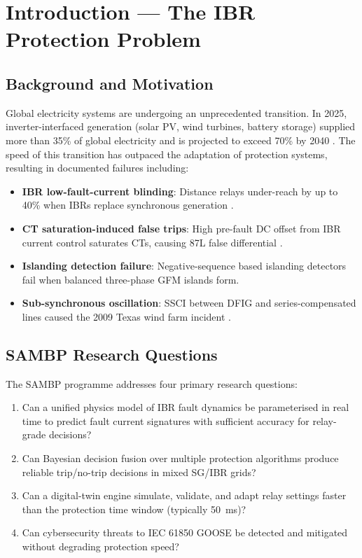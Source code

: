 \documentclass[11pt,a4paper]{report}
\newcommand{\sambp}{\textsc{SAMBP}}
\newcommand{\ibr}{\textsc{IBR}}
\begin{document}
\chapter{Introduction — The IBR Protection Problem}
\label{ch:intro}

\section{Background and Motivation}

Global electricity systems are undergoing an unprecedented transition. In 2025, inverter-interfaced generation (solar PV, wind turbines, battery storage) supplied more than 35\% of global electricity and is projected to exceed 70\% by 2040 \cite{irena2025}. The speed of this transition has outpaced the adaptation of protection systems, resulting in documented failures including:

\begin{itemize}
  \item \textbf{IBR low-fault-current blinding}: Distance relays under-reach by up to 40\% when IBRs replace synchronous generation \cite{nerc2017}.
  \item \textbf{CT saturation-induced false trips}: High pre-fault DC offset from IBR current control saturates CTs, causing 87L false differential \cite{iec87l2019}.
  \item \textbf{Islanding detection failure}: Negative-sequence based islanding detectors fail when balanced three-phase GFM islands form.
  \item \textbf{Sub-synchronous oscillation}: SSCI between DFIG and series-compensated lines caused the 2009 Texas wind farm incident \cite{ssci2010}.
\end{itemize}

\section{SAMBP Research Questions}

The \sambp{} programme addresses four primary research questions:

\begin{enumerate}
  \item[\textbf{RQ1}] Can a unified physics model of \ibr{} fault dynamics be parameterised in real time to predict fault current signatures with sufficient accuracy for relay-grade decisions?
  \item[\textbf{RQ2}] Can Bayesian decision fusion over multiple protection algorithms produce reliable trip/no-trip decisions in mixed SG/IBR grids?
  \item[\textbf{RQ3}] Can a digital-twin engine simulate, validate, and adapt relay settings faster than the protection time window (typically \SI{50}{\milli\second})?
  \item[\textbf{RQ4}] Can cybersecurity threats to IEC 61850 GOOSE be detected and mitigated without degrading protection speed?
\end{enumerate}
\end{document}
